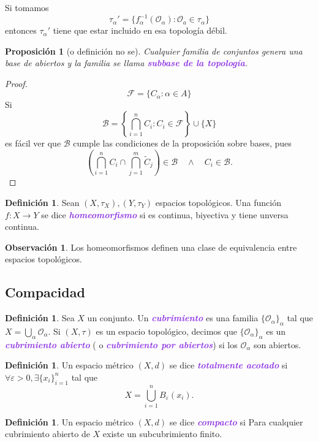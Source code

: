 \documentclass{article}
\newtheorem{proposition}[theorem]{Proposición}
\theoremstyle{definition}
\newtheorem{definition}[theorem]{Definición}
\newtheorem*{obs}{Observación}
\theoremstyle{remark}
\numberwithin{equation}{section}
\newcommand{\B}{\mathcal{B}}
\renewcommand{\O}{\mathcal{O}}
\newcommand{\Fcal}{\mathcal{F}}
\renewcommand{\a}{\alpha}
\newcommand{\e}{\varepsilon}
\renewcommand{\t}{\tau}
\renewcommand{\tilde}{\widetilde}
\newcommand{\br}[1]{\left( #1 \right)}
\newcommand{\set}[1]{\left\{ #1 \right\}}
\newcommand{\ds}{\displaystyle}
\newcommand{\wea}[1]{\textcolor{BlueViolet}{\textbf{\emph{#1}}}}
\begin{document}
Si tomamos $$\t_\a' = \{f_\a^{-1}(\O_\a) \colon \O_a \in \t_\a\}$$ entonces $\t_\a'$ tiene que estar incluido en esa topología débil.

\begin{proposition}[o definición no se]
  Cualquier familia de conjuntos genera una base de abiertos y la familia se llama \wea{subbase de la topología}.
\end{proposition}
\begin{proof}
  $$\Fcal = \{C_\a \colon \a \in A\}$$
  Si $$\B = \set{\bigcap_{i=1}^n C_i \colon C_i \in \Fcal} \cup \{X\}$$
  es fácil ver que $\B$ cumple las condiciones de la proposición sobre bases, pues
  \[\br{\bigcap_{i=1}^n C_i \cap \bigcap_{j=1}^m \tilde C_j} \in \B \quad\land\quad C_i \in \B.\]
\end{proof}

\begin{definition}
  Sean $(X,\t_X), (Y,\t_Y)$ espacios topológicos. Una función $f \colon X \to Y$ se dice \wea{homeomorfismo} si es continua, biyectiva y tiene unversa continua.
\end{definition}

\begin{obs}
  Los homeomorfismos definen una clase de equivalencia entre espacios topológicos.
\end{obs}

\newpage
\subsection{Compacidad}

\begin{definition}
  Sea $X$ un conjunto. Un \wea{cubrimiento} es una familia $\{\O_\a\}_\a$ tal que $\ds X = \bigcup_\a \O_\a$. Si $(X,\t)$ es un espacio topológico, decimos que $\{\O_\a\}_\a$ es un \wea{cubrimiento abierto} ( o \wea{cubrimiento por abiertos}) si los $\O_\a$ son abiertos.
\end{definition}

\begin{definition}
  Un espacio métrico $(X,d)$ se dice \wea{totalmente acotado} si $\forall \e>0, \exists \{x_i\}_{i=1}^n$ tal que $$X = \bigcup_{i=1}^n B_\e(x_i).$$
\end{definition}

\begin{definition}
  Un espacio métrico $(X,d)$ se dice \wea{compacto} si Para cualquier cubrimiento abierto de $X$ existe un subcubrimiento finito.
\end{definition}
\end{document}
